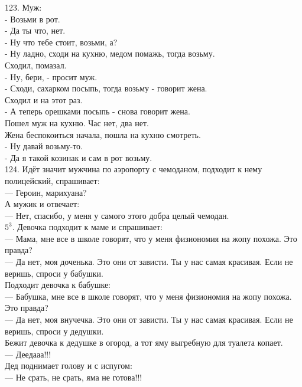 \documentclass[a4paper,20pt,notitlepage]{extbook}
\begin{document}
	123. Муж: \\
	- Возьми в рот. \\
	- Да ты что, нет. \\
	- Ну что тебе стоит, возьми, а? \\
	- Ну ладно, сходи на кухню, медом помажь, тогда возьму. \\
	Сходил, помазал. \\
	- Ну, бери, - просит муж. \\
	- Сходи, сахарком посыпь, тогда возьму - говорит жена. \\
	Сходил и на этот раз. \\
	- А теперь орешками посыпь - снова говорит жена. \\
	Пошел муж на кухню. Час нет, два нет. \\
	Жена беспокоиться начала, пошла на кухню смотреть. \\
	- Ну давай возьму-то. \\
	- Да я такой козинак и сам в рот возьму.\\
	
	124. Идёт значит мужчина по аэропорту с чемоданом, подходит к нему полицейский, спрашивает:\\
	— Героин, марихуана?\\
	А мужик и отвечает:\\
	— Нет, спасибо, у меня у самого этого добра целый чемодан.\\

	$5^3$. Девочка подходит к маме и спрашивает:\\
	— Мама, мне все в школе говорят, что у меня физиономия на жопу похожа. Это правда?\\
	— Да нет, моя доченька. Это они от зависти. Ты у нас самая красивая. Если не веришь, спроси у бабушки.\\
	Подходит девочка к бабушке:\\
	— Бабушка, мне все в школе говорят, что у меня физиономия на жопу похожа. Это правда?\\
	— Да нет, моя внучечка. Это они от зависти. Ты у нас самая красивая. Если не веришь, спроси у дедушки.\\
	Бежит девочка к дедушке в огород, а тот яму выгребную для туалета копает.\\
	— Деедааа!!!\\
	Дед поднимает голову и с испугом:\\
	— Не срать, не срать, яма не готова!!!\\
	
\end{document}
